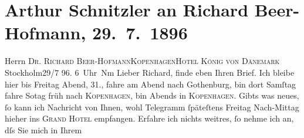 

         
         \renewcommand{\erwaehntePersonen}{Personen: Richard Beer-Hofmann, Paul Goldmann,  Schnitzler, A. Schnitzler}
         \renewcommand{\erwaehnteOrte}{Orte: Grand Hotel Stockholm, Göteborg, Hotel König von Dänemark, Kopenhagen, Skodsborg, Stockholm}
         \renewcommand{\erwaehnteWerke}{}
               \section[Arthur Schnitzler an Richard Beer-Hofmann, 29. 7. 1896]{ Arthur Schnitzler an Richard Beer-Hofmann, 29. 7. 1896}\nopagebreak{}\rehead{ }\begin{ledgroupsized}[t]{13cm}\normalsize\beginnumbering \toendnotes[C]{\smallbreak\pagebreak[2]} 
\pstart{}{\pb}Herrn \textsc{Dr. Richard
                     Beer-Hofmann}\pend{}\pstart{}\textsc{Kopenhagen}\pend{}\pstart{}\textsc{Hotel König von Dänemark}\pend{}{\bigskip}\pstart
           \raggedleft{}{\pb}Stockholm29/7 96. 6 Uhr Nm\pend
           \pstart
           Lieber Richard, finde eben Ihren Brief. Ich bleibe hier bis
                  Freitag{ }Abend, 31., fahre am Abend nach Gothenburg, bin dort Samſtag{ } fahre So{\geminationn}tag früh nach \textsc{Kopenhagen}, bin Abends in \textsc{Kopenhagen}. Gibts was neues, ſo kann ich Nachricht von Ihnen, wohl Telegramm ſpäteſtens
                  Freitag{ }\introOben{}Nach-\introOben{}Mittag hieher ins \textsc{Grand Hotel} empfangen. Erfahre ich nichts weitres, ſo nehme ich an, dſs Sie mich in Ihrem

\end{ledgroupsized}
